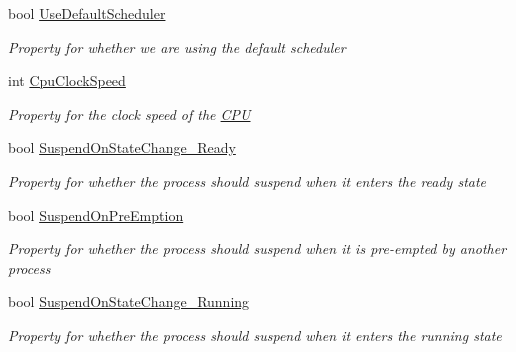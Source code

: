 \begin{DoxyCompactItemize}
bool \hyperlink{class_c_p_u___o_s___simulator_1_1_operating___system_1_1_o_s_core_a1fd8b54b31fa415f09f2b9bc407802dd}{Use\+Default\+Scheduler}
\begin{DoxyCompactList}\small\item\em Property for whether we are using the default scheduler \end{DoxyCompactList}\item 
int \hyperlink{class_c_p_u___o_s___simulator_1_1_operating___system_1_1_o_s_core_a1ea93a6cc37dbae4bc607d09fd6e75db}{Cpu\+Clock\+Speed}
\begin{DoxyCompactList}\small\item\em Property for the clock speed of the \hyperlink{namespace_c_p_u___o_s___simulator_1_1_c_p_u}{C\+P\+U} \end{DoxyCompactList}\item 
bool \hyperlink{class_c_p_u___o_s___simulator_1_1_operating___system_1_1_o_s_core_a58135ead5821cb968f25c20417dd460a}{Suspend\+On\+State\+Change\+\_\+\+Ready}
\begin{DoxyCompactList}\small\item\em Property for whether the process should suspend when it enters the ready state \end{DoxyCompactList}\item 
bool \hyperlink{class_c_p_u___o_s___simulator_1_1_operating___system_1_1_o_s_core_aaea8e895847f690b5a4104bf4326f3ab}{Suspend\+On\+Pre\+Emption}
\begin{DoxyCompactList}\small\item\em Property for whether the process should suspend when it is pre-\/empted by another process \end{DoxyCompactList}\item 
bool \hyperlink{class_c_p_u___o_s___simulator_1_1_operating___system_1_1_o_s_core_a8dfe787e5954a595f63012f9a2d00d64}{Suspend\+On\+State\+Change\+\_\+\+Running}
\begin{DoxyCompactList}\small\item\em Property for whether the process should suspend when it enters the running state \end{DoxyCompactList}\item 

\end{DoxyCompactItemize}
